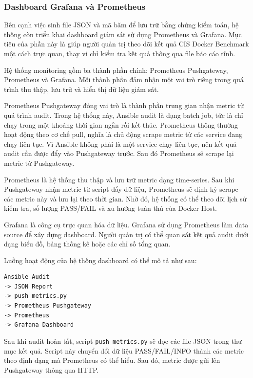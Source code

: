 \subsubsection{Dashboard Grafana và Prometheus}\label{output-dashboard-grafana-prometheus}

Bên cạnh việc sinh file JSON và mã băm để lưu trữ bằng chứng kiểm toán, hệ thống còn triển khai dashboard giám sát sử dụng Prometheus và Grafana. Mục tiêu của phần này là giúp người quản trị theo dõi kết quả CIS Docker Benchmark một cách trực quan, thay vì chỉ kiểm tra kết quả thông qua file báo cáo tĩnh.

Hệ thống monitoring gồm ba thành phần chính: Prometheus Pushgateway, Prometheus và Grafana. Mỗi thành phần đảm nhận một vai trò riêng trong quá trình thu thập, lưu trữ và hiển thị dữ liệu giám sát.

Prometheus Pushgateway đóng vai trò là thành phần trung gian nhận metric từ quá trình audit. Trong hệ thống này, Ansible audit là dạng batch job, tức là chỉ chạy trong một khoảng thời gian ngắn rồi kết thúc. Prometheus thông thường hoạt động theo cơ chế pull, nghĩa là chủ động scrape metric từ các service đang chạy liên tục. Vì Ansible không phải là một service chạy liên tục, nên kết quả audit cần được đẩy vào Pushgateway trước. Sau đó Prometheus sẽ scrape lại metric từ Pushgateway.

Prometheus là hệ thống thu thập và lưu trữ metric dạng time-series. Sau khi Pushgateway nhận metric từ script đẩy dữ liệu, Prometheus sẽ định kỳ scrape các metric này và lưu lại theo thời gian. Nhờ đó, hệ thống có thể theo dõi lịch sử kiểm tra, số lượng PASS/FAIL và xu hướng tuân thủ của Docker Host.

Grafana là công cụ trực quan hóa dữ liệu. Grafana sử dụng Prometheus làm data source để xây dựng dashboard. Người quản trị có thể quan sát kết quả audit dưới dạng biểu đồ, bảng thống kê hoặc các chỉ số tổng quan.

Luồng hoạt động của hệ thống dashboard có thể mô tả như sau:

\begin{verbatim}
Ansible Audit
-> JSON Report
-> push_metrics.py
-> Prometheus Pushgateway
-> Prometheus
-> Grafana Dashboard
\end{verbatim}

Sau khi audit hoàn tất, script \texttt{push\_metrics.py} sẽ đọc các file JSON trong thư mục kết quả. Script này chuyển đổi dữ liệu PASS/FAIL/INFO thành các metric theo định dạng mà Prometheus có thể hiểu. Sau đó, metric được gửi lên Pushgateway thông qua HTTP.

